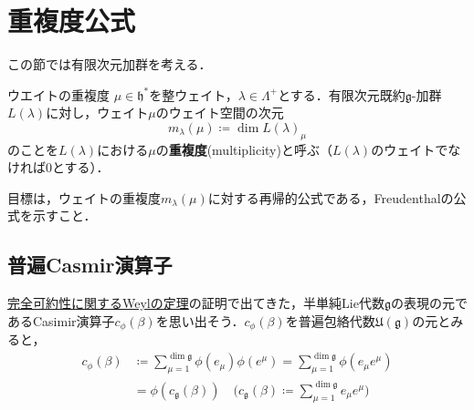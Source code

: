 \documentclass[rep_main]{subfiles}
\begin{document}
\section{重複度公式}
この節では有限次元加群を考える．
\begin{mydef}[label=def:mutiplicity]{ウエイトの重複度}
	$\mu \in \mathfrak{h}^*$を整ウェイト，$\lambda \in \Lambda^+$とする．有限次元既約$\mathfrak{g}$-加群$L(\lambda)$に対し，ウェイト$\mu$のウェイト空間の次元
	\begin{equation}
		m_\lambda(\mu) \coloneqq \dim L(\lambda)_\mu
	\end{equation}
	のことを$L(\lambda)$における$\mu$の\textbf{重複度}(multiplicity)と呼ぶ（$L(\lambda)$のウェイトでなければ$0$とする）．
\end{mydef}
目標は，ウェイトの重複度$m_\lambda(\mu)$に対する再帰的公式である，Freudenthalの公式を示すこと．

\subsection{普遍Casmir演算子}
\hyperref[thm:Weyl]{完全可約性に関するWeylの定理}の証明で出てきた，半単純Lie代数$\mathfrak{g}$の表現の元であるCasimir演算子$c_\phi(\beta)$を思い出そう．$c_\phi(\beta)$を普遍包絡代数$\mathfrak{U}(\mathfrak{g})$の元とみると，
\begin{align}
	c_\phi(\beta) &\coloneqq \sum_{\mu=1}^{\dim\mathfrak{g}} \phi(e_\mu)\phi(e^\mu) = \sum_{\mu=1}^{\dim\mathfrak{g}} \phi(e_\mu e^\mu) \\
	\label{eq:univ-Casmir-beta}
	&= \phi(c_\mathfrak{g}(\beta))\quad  \biggl(c_\mathfrak{g}(\beta) \coloneqq \sum_{\mu=1}^{\dim\mathfrak{g}} e_\mu e^\mu \biggr)
\end{align}
\end{document}
